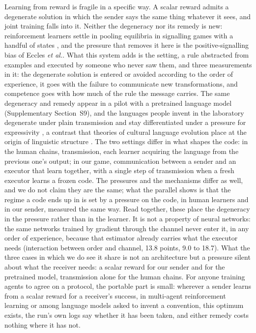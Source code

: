 \documentclass{nature}
\begin{document}
Learning from reward is fragile in a specific way. A scalar reward admits a degenerate solution in which the
sender says the same thing whatever it sees, and joint training falls into it. Neither the degeneracy nor its
remedy is new: reinforcement learners settle in pooling equilibria in signalling games with a handful of states
\cite{huttegger2010,barrett2009}, and the pressure that removes it here is the positive-signalling bias of Eccles
\emph{et al.}\cite{eccles2019}. What this system adds is the setting, a rule abstracted from examples and executed
by someone who never saw them, and three measurements in it: the degenerate solution is entered or avoided
according to the order of experience, it goes with the failure to communicate new transformations, and competence
goes with how much of the rule the message carries. The same degeneracy and remedy appear in a pilot with a
pretrained language model (Supplementary Section~S9), and the languages people invent in the laboratory degenerate
under plain transmission and stay differentiated under a pressure for expressivity \cite{kirby2008}, a contrast
that theories of cultural language evolution place at the origin of linguistic structure \cite{kirby2015}. The two
settings differ in what shapes the code: in the human chains, transmission, each learner acquiring the language
from the previous one's output; in our game, communication between a sender and an executor that learn together,
with a single step of transmission when a fresh executor learns a frozen code. The pressures and the mechanisms
differ as well, and we do not claim they are the same; what the parallel shows is that the
regime a code ends up in is set by a pressure on the code, in human learners and in our sender, measured the same
way. Read together, these place the degeneracy in the pressure rather than in the learner. It is not a property of
neural networks: the same networks trained by gradient through the channel never enter it, in any order of
experience, because that estimator already carries what the executor needs (interaction between order and channel,
13.8 points, 9.0 to 18.7). What the three cases in which we do see it share is not an architecture but a pressure
silent about what the receiver needs: a scalar reward for our sender and for the pretrained model, transmission
alone for the human chains. For anyone training agents to agree on a protocol, the portable part is small: wherever
a sender learns from a scalar reward for a receiver's success, in multi-agent reinforcement learning or among
language models asked to invent a convention, this optimum exists, the run's own logs say whether it has been
taken, and either remedy costs nothing where it has not.
\end{document}
